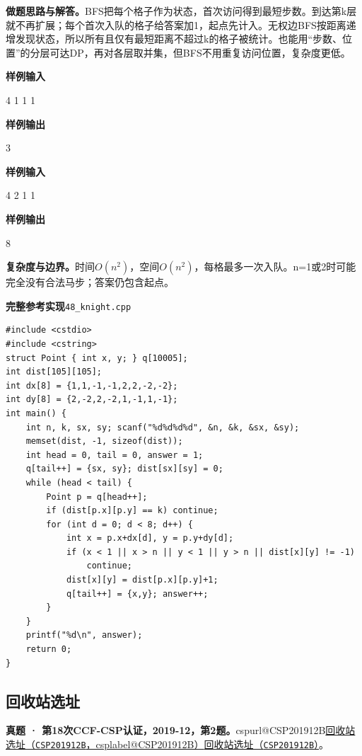 \documentclass[UTF8,11pt,a4paper,fontset=none]{ctexart}
\makeatletter
\newcommand{\csp}[2]{\ifcsname cspurl@#1\endcsname\href{\csname cspurl@#1\endcsname}{#2（\texttt{#1}，\csname csplabel@#1\endcsname）}\else\href{https://oj.shumeng.tech/p/#1}{#2（\texttt{#1}）}\fi}
\makeatother
\begin{document}
\noindent\textbf{做题思路与解答。}BFS把每个格子作为状态，首次访问得到最短步数。到达第k层就不再扩展；每个首次入队的格子给答案加1，起点先计入。无权边BFS按距离递增发现状态，所以所有且仅有最短距离不超过k的格子被统计。也能用“步数、位置”的分层可达DP，再对各层取并集，但BFS不用重复访问位置，复杂度更低。
\begin{tcolorbox}[samplebox,title={输入输出样例}]
\textbf{样例输入}
\begin{Sample}
4 1
1 1
\end{Sample}
\tcblower
\textbf{样例输出}
\begin{Sample}
3
\end{Sample}
\end{tcolorbox}
\begin{tcolorbox}[samplebox,title={输入输出样例}]
\textbf{样例输入}
\begin{Sample}
4 2
1 1
\end{Sample}
\tcblower
\textbf{样例输出}
\begin{Sample}
8
\end{Sample}
\end{tcolorbox}

\noindent\textbf{复杂度与边界。}时间$O(n^2)$，空间$O(n^2)$，每格最多一次入队。n=1或2时可能完全没有合法马步；答案仍包含起点。
\par\noindent\begin{minipage}{\linewidth}
\textbf{完整参考实现}\quad\texttt{48\_knight.cpp}
\begin{lstlisting}
#include <cstdio>
#include <cstring>
struct Point { int x, y; } q[10005];
int dist[105][105];
int dx[8] = {1,1,-1,-1,2,2,-2,-2};
int dy[8] = {2,-2,2,-2,1,-1,1,-1};
int main() {
    int n, k, sx, sy; scanf("%d%d%d%d", &n, &k, &sx, &sy);
    memset(dist, -1, sizeof(dist));
    int head = 0, tail = 0, answer = 1;
    q[tail++] = {sx, sy}; dist[sx][sy] = 0;
    while (head < tail) {
        Point p = q[head++];
        if (dist[p.x][p.y] == k) continue;
        for (int d = 0; d < 8; d++) {
            int x = p.x+dx[d], y = p.y+dy[d];
            if (x < 1 || x > n || y < 1 || y > n || dist[x][y] != -1)
                continue;
            dist[x][y] = dist[p.x][p.y]+1;
            q[tail++] = {x,y}; answer++;
        }
    }
    printf("%d\n", answer);
    return 0;
}
\end{lstlisting}
\end{minipage}\par


\subsection{回收站选址}
\textbf{真题 · 第18次CCF-CSP认证，2019-12，第2题。}\csp{CSP201912B}{回收站选址}。
\end{document}
